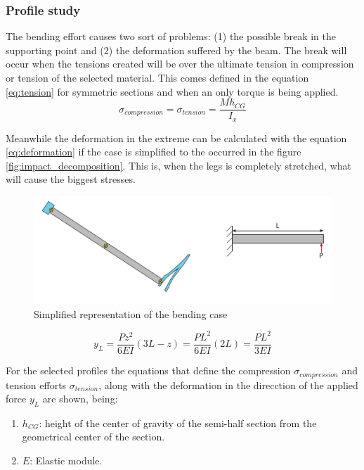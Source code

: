 \subsubsection{Profile study} %
\label{ssub:profile_study}
  The bending effort causes two sort of problems: (1) the possible break in the supporting point and (2) the deformation suffered by the beam.
  The break will occur when the tensions created will be over the ultimate tension in compression or tension of the selected material.
  This comes defined in the equation \ref{eq:tension} for symmetric sections and when an only torque is being applied.
  \begin{equation}
  \label{eq:tension}
    \sigma _{compression} = \sigma _{tension} = \frac{M h_{CG}}{I_x}
  \end{equation}

  Meanwhile the deformation in the extreme can be calculated with the equation \ref{eq:deformation} if the case is simplified to the occurred in the figure \ref{fig:impact_decomposition}.
  This is, when the legs is completely stretched, what will cause the biggest stresses.

  \begin{figure}[ht!]
    \centering
    \includegraphics[width=\textwidth]{figures/bending_case.pdf}
    \caption{Simplified representation of the bending case}
    \label{fig:bending case}
  \end{figure}

  \begin{equation}
  \label{eq:deformation}
    y_L = \frac{P z^2}{6EI}(3L-z) = \frac{P L^2}{6EI}(2L) = \frac{P L^2}{3EI}
  \end{equation}


  For the selected profiles the equations that define the compression $\sigma _{compression}$ and tension efforts $\sigma _{tension}$, along with the deformation in the direcction of the applied force $y_L$ are shown, being:

  \begin{enumerate}
    \item $h_{CG}$: height of the center of gravity of the semi-half section from the geometrical center of the section.

    \item $E$: Elastic module.
  \end{enumerate}


